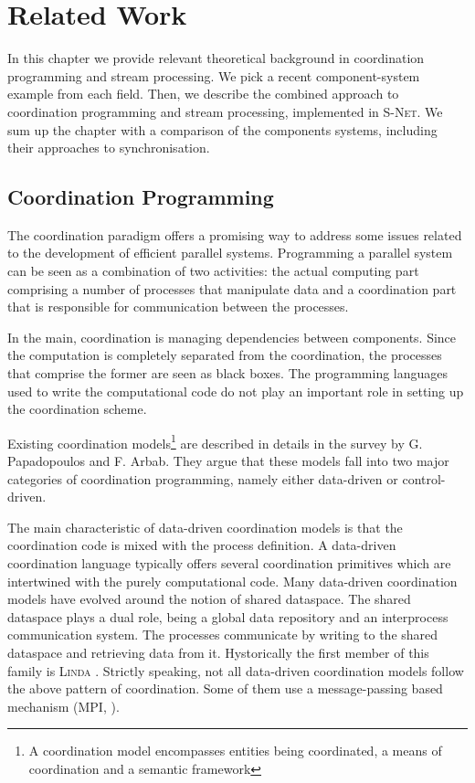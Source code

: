 \chapter{Related Work}\label{chap_found}
In this chapter we provide relevant theoretical background in coordination programming and stream processing. We pick a recent component-system example from each field. Then, we describe the combined approach to coordination programming and stream processing, implemented in \textsc{S-Net}. We sum up the chapter with a comparison of the  components systems, including their approaches to synchronisation.


    \section{Coordination Programming}
The coordination paradigm offers a promising way to address some issues related to the development of efficient parallel systems. Programming a parallel system can be seen as a combination of two activities: the actual computing part comprising a number of processes that manipulate data and a coordination part that is responsible for communication between the processes.

In the main, coordination is managing dependencies between components. Since the computation is completely separated from the coordination, the processes that comprise the former are seen as black boxes. The programming languages used to write the computational code do not play an important role in setting up the coordination scheme.

Existing coordination models\footnote{A coordination model encompasses entities being coordinated, a means of coordination and a semantic framework} are described in details in the survey \cite{papadopoulos} by G. Papadopoulos and F. Arbab. They argue that these models fall into two major categories of coordination programming, namely either data-driven or control-driven.

The main characteristic of data-driven coordination models is that the coordination code is mixed with the process definition. A data-driven coordination language typically offers several coordination primitives which are intertwined with the purely computational code. Many data-driven coordination models have evolved around the notion of shared dataspace. The shared dataspace plays a dual role, being a global data repository and an interprocess communication system. The processes communicate by writing to the shared dataspace and retrieving data from it. Hystorically the first member of this family is \textsc{Linda} \cite{linda}. Strictly speaking, not all data-driven coordination models follow the above pattern of coordination. Some of them use a message-passing based mechanism (\textsc{MPI}, \cite{mpi}).

